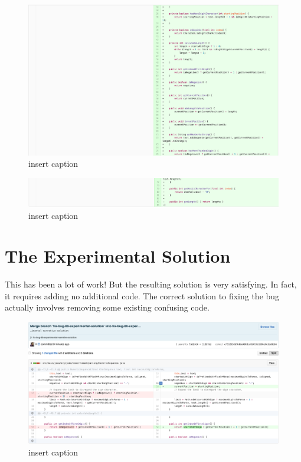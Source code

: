 \begin{figure}[H]
	\centering
	\includegraphics[width=\linewidth]{code136}
	\caption{insert caption}
\end{figure}
\begin{figure}[H]
	\centering
	\includegraphics[width=\linewidth]{code137}
	\caption{insert caption}
\end{figure}
 
\section{The Experimental Solution}

This has been a lot of work! But the resulting solution is very satisfying. In fact, it requires adding no additional code. The correct solution to fixing the bug actually involves removing some existing confusing code.

\begin{figure}[H]
	\centering
	\includegraphics[width=\linewidth]{code138}
	\caption{insert caption}
\end{figure}

